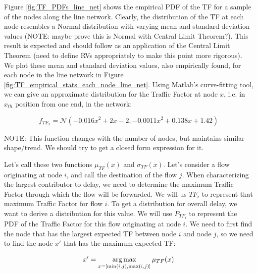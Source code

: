 Figure \ref{fig:TF_PDFs_line_net} shows the empirical PDF of the TF for a sample of the nodes along the line network.  Clearly, the distribution of the TF at each node resembles a Normal distribution with varying mean and standard deviation values (NOTE: maybe prove this is Normal with Central Limit Theorem?).  This result is expected and should follow as an application of the Central Limit Theorem (need to define RVs appropriately to make this point more rigorous).  We plot these mean and standard deviation values, also empirically found, for each node in the line network in Figure \ref{fig:TF_empirical_stats_each_node_line_net}.  Using Matlab's curve-fitting tool, we can give an approximate distribution for the Traffic Factor at node $x$, i.e. in $x_{th}$ position from one end, in the network:

\begin{equation}
	f_{TF_x} = \mathcal{N}(-0.016x^2+2x-2, -0.0011x^2+0.138x+1.42)
\end{equation}

NOTE:  This function changes with the number of nodes, but maintains similar shape/trend.  We should try to get a closed form expression for it.


Let's call these two functions $\mu_{TF}(x)$ and $\sigma_{TF}(x)$.  Let's consider a flow originating at node $i$, and call the destination of the flow $j$.  When characterizing the largest contributor to delay, we need to determine the maximum Traffic Factor through which the flow will be forwarded.  We will us $TF_i$ to represent that maximum Traffic Factor for flow $i$.  To get a distribution for overall delay, we want to derive a distribution for this value.  We will use $P_{TF_i}$ to represent the PDF of the Traffic Factor for this flow originating at node $i$.  
We need to first find the node that has the largest expected TF between node $i$ and node $j$, so we need to find the node $x'$ that has the maximum expected TF:

\begin{equation}
	x' = \operatorname*{arg\,max}_{x = [\min(i,j), \max(i,j)]} \mu_{TF}(x) 
\end{equation}

